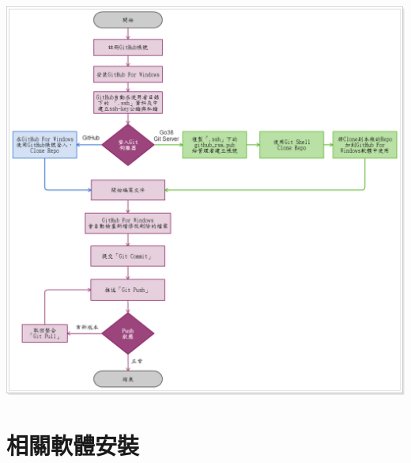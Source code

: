 \documentclass[letterpaper,10pt,english]{sphinxmanual}
\begin{document}
\includegraphics{_doc/writing/pic/FlowChart.png}


\section{相關軟體安裝}
\label{_doc/writing/index-github:id5}
\end{document}
